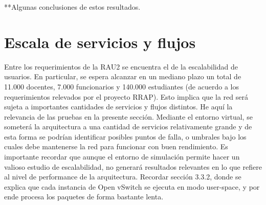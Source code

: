 
**Algunas conclusiones de estos resultados.


\section{Escala de servicios y flujos}
Entre los requerimientos de la RAU2 se encuentra el de la escalabilidad de usuarios. En particular, se espera alcanzar en un mediano plazo un total de 11.000 docentes, 7.000 funcionarios y 140.000 estudiantes (de acuerdo a los requerimientos relevados por el proyecto RRAP). Esto implica que la red será sujeta a importantes cantidades de servicios y flujos distintos. He aquí la relevancia de las pruebas en la presente sección. Mediante el entorno virtual, se someterá la arquitectura a una cantidad de servicios relativamente grande y de esta forma se podrían identificar posibles puntos de falla, o umbrales bajo los cuales debe mantenerse la red para funcionar con buen rendimiento. Es importante recordar que aunque el entorno de simulación permite hacer un valioso estudio de escalabilidad, no generará resultados relevantes en lo que refiere al nivel de performance de la arquitectura. Recordar sección 3.3.2, donde se explica que cada instancia de Open vSwitch se ejecuta en modo user-space, y por ende procesa los paquetes de forma bastante lenta.

